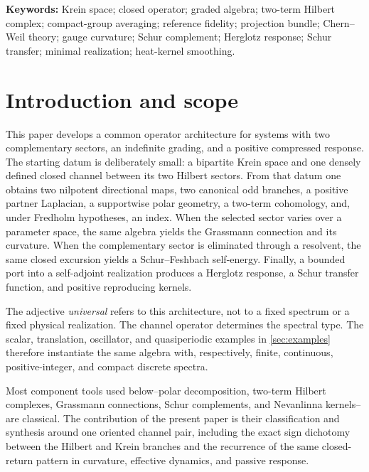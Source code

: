 \documentclass[11pt,reqno]{scrartcl}
\theoremstyle{plain}
\theoremstyle{definition}
\theoremstyle{remark}
\begin{document}
\medskip
\noindent\textbf{Keywords:} Krein space; closed operator; graded algebra;
two-term Hilbert complex; compact-group averaging; reference fidelity;
projection bundle; Chern--Weil theory; gauge curvature; Schur complement;
Herglotz response; Schur transfer; minimal realization; heat-kernel smoothing.

\clearpage
\setcounter{tocdepth}{2}
\tableofcontents

\clearpage

\section{Introduction and scope}
\label{sec:introduction}

This paper develops a common operator architecture for systems with two
complementary sectors, an indefinite grading, and a positive compressed
response.  The starting datum is deliberately small: a bipartite Krein space
and one densely defined closed channel between its two Hilbert sectors.  From
that datum one obtains two nilpotent directional maps, two canonical odd
branches, a positive partner Laplacian, a supportwise polar geometry, a
two-term cohomology, and, under Fredholm hypotheses, an index.  When the
selected sector varies over a
parameter space, the same algebra yields the Grassmann connection and its
curvature.  When the complementary sector is eliminated through a resolvent,
the same closed excursion yields a Schur--Feshbach self-energy.  Finally, a
bounded port into a self-adjoint realization produces a Herglotz response, a
Schur transfer function, and positive reproducing kernels.

The adjective \emph{universal} refers to this architecture, not to a fixed
spectrum or a fixed physical realization.  The channel operator determines
the spectral type.  The scalar, translation, oscillator, and quasiperiodic
examples in \cref{sec:examples} therefore instantiate the same algebra with,
respectively, finite, continuous, positive-integer, and compact discrete
spectra.

Most component tools used below--polar decomposition, two-term Hilbert
complexes, Grassmann connections, Schur complements, and Nevanlinna kernels--
are classical.  The contribution of the present paper is their classification
and synthesis around one oriented channel pair, including the exact sign
dichotomy between the Hilbert and Krein branches and the recurrence of the
same closed-return pattern in curvature, effective dynamics, and passive
response.
\end{document}
